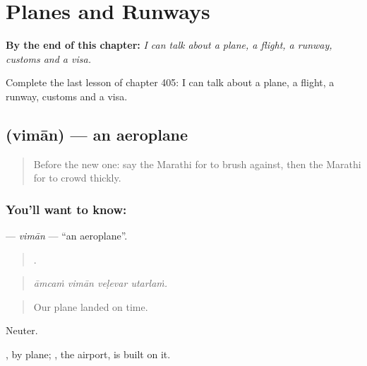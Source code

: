
\chapter{Planes and Runways}
\label{ch:mr-planes-and-runways}

\begin{chapteropening}
\textbf{By the end of this chapter:} \emph{I can talk about a plane, a flight, a runway, customs and a visa.}

Complete the last lesson of chapter 405: I can talk about a plane, a flight, a runway, customs and a visa.
\end{chapteropening}

\section[\texorpdfstring{\mr{विमान} (vimān)}{विमान (vimān)}]{ (vimān) — an aeroplane}

\label{lesson:MR-C405-viman}



\begin{quote}
Before the new one: say the Marathi for to brush against, then the Marathi for to crowd thickly.
\end{quote}

\subsection*{You'll want to know: }
\textbf{} — \emph{vimān} — \textquotedblleft{}an aeroplane\textquotedblright{}.

\begin{quote}
   .
\end{quote}

\begin{quote}
\emph{āmcaṁ vimān veḷevar utarlaṁ.}
\end{quote}

\begin{quote}
Our plane landed on time.
\end{quote}

Neuter.

, by plane; , the airport, is built on it.

